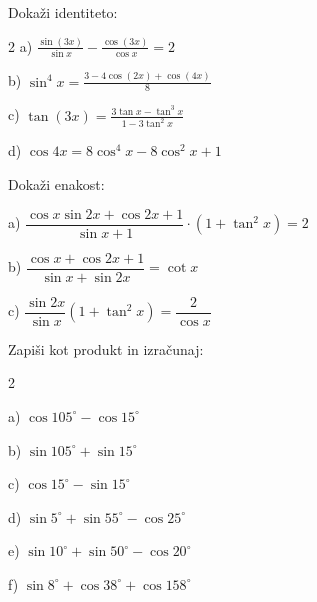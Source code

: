\documentclass[a4paper,12pt]{letter}
\begin{document}
\begin{naloga}

Dokaži identiteto:

\begin{multicols}{2}
a) $\frac{\sin(3x)}{\sin x} - \frac{\cos(3x)}{\cos x} = 2$

b) $\sin^4 x = \frac{3 - 4\cos(2x) + \cos(4x)}{8}$

c) $\tan(3x) = \frac{3\tan x - \tan^3 x}{1 - 3\tan^2 x}$

d) $\cos 4x=8\cos^4 x-8\cos^2x+1$

\end{multicols}


\end{naloga}
\begin{naloga}

Dokaži enakost:

a) $\dfrac{\cos x\sin 2x+\cos 2x+1}{\sin x+1}\cdot (1+\tan^2 x)=2$

b) $\dfrac{\cos x+\cos2x+1}{\sin x+\sin 2x}=\cot x$

c) $\dfrac{\sin 2x}{\sin x}(1+\tan^2 x)=\dfrac{2}{\cos x}$

\end{naloga}

\begin{naloga}
    Zapiši kot produkt in izračunaj:
\begin{multicols}{2}

    a) $\cos 105^{\circ}-\cos 15^{\circ}$

    b) $\sin 105^{\circ}+\sin 15^{\circ}$

    c) $\cos 15^{\circ}-\sin 15^{\circ}$

    d) $\sin 5^{\circ}+\sin 55^{\circ}-\cos 25^{\circ}$
    
    e) $\sin 10^{\circ}+\sin 50^{\circ}-\cos 20^{\circ}$

    f) $\sin 8^{\circ}+\cos 38^{\circ}+\cos 158^{\circ}$
  \end{multicols}  
\end{naloga}
\end{document}
